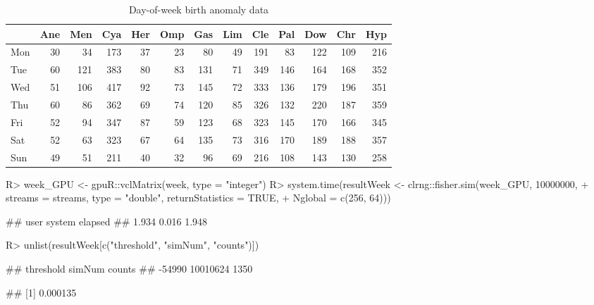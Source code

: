 \documentclass[article,nojss]{jss}\usepackage[]{graphicx}\usepackage[]{color}
\begin{document}
\begin{table}

\caption{\label{tab:weekdata}Day-of-week birth anomaly data\label{tab:week}}
\centering
\begin{tabular}[t]{lrrrrrrrrrrrr}
\toprule
  & Ane & Men & Cya & Her & Omp & Gas & Lim & Cle & Pal & Dow & Chr & Hyp\\
\midrule
Mon & 30 & 34 & 173 & 37 & 23 & 80 & 49 & 191 & 83 & 122 & 109 & 216\\
Tue & 60 & 121 & 383 & 80 & 83 & 131 & 71 & 349 & 146 & 164 & 168 & 352\\
Wed & 51 & 106 & 417 & 92 & 73 & 145 & 72 & 333 & 136 & 179 & 196 & 351\\
Thu & 60 & 86 & 362 & 69 & 74 & 120 & 85 & 326 & 132 & 220 & 187 & 359\\
Fri & 52 & 94 & 347 & 87 & 59 & 123 & 68 & 323 & 145 & 170 & 166 & 345\\
Sat & 52 & 63 & 323 & 67 & 64 & 135 & 73 & 316 & 170 & 189 & 188 & 357\\
Sun & 49 & 51 & 211 & 40 & 32 & 96 & 69 & 216 & 108 & 143 & 130 & 258\\
\bottomrule
\end{tabular}
\end{table}




\begin{CodeChunk}
\begin{CodeInput}
R> week_GPU <- gpuR::vclMatrix(week, type = "integer")
R> system.time(resultWeek <- clrng::fisher.sim(week_GPU, 10000000,
+    streams = streams, type = "double", returnStatistics = TRUE,
+    Nglobal = c(256, 64)))
\end{CodeInput}
\begin{CodeOutput}
##    user  system elapsed 
##   1.934   0.016   1.948
\end{CodeOutput}
\begin{CodeInput}
R> unlist(resultWeek[c("threshold", "simNum", "counts")])
\end{CodeInput}
\begin{CodeOutput}
## threshold    simNum    counts 
##    -54990  10010624      1350
\end{CodeOutput}
\begin{CodeOutput}
## [1] 0.000135
\end{CodeOutput} 
\end{CodeChunk} 
\end{document}
